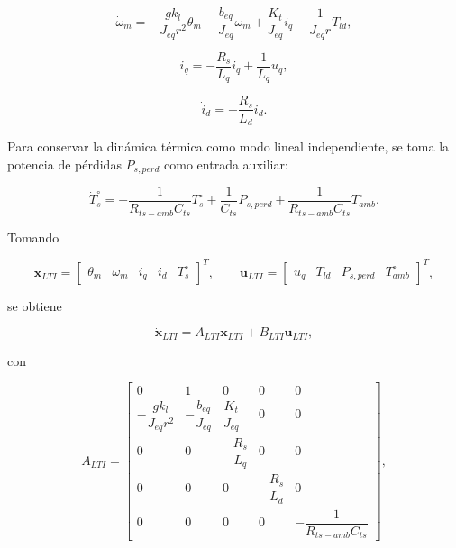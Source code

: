 \documentclass[10pt,a4paper]{article}
\begin{document}
\begin{equation}
    \dot{\omega}_m
    =
    -\frac{gk_l}{J_{eq}r^2}\theta_m
    -
    \frac{b_{eq}}{J_{eq}}\omega_m
    +
    \frac{K_t}{J_{eq}}i_q
    -
    \frac{1}{J_{eq}r}T_{ld},
    \label{eq:lti_omega_dot}
\end{equation}

\begin{equation}
    \dot{i}_q
    =
    -\frac{R_s}{L_q}i_q
    +
    \frac{1}{L_q}u_q,
    \label{eq:lti_iq_dot}
\end{equation}

\begin{equation}
    \dot{i}_d
    =
    -\frac{R_s}{L_d}i_d.
    \label{eq:lti_id_dot}
\end{equation}

Para conservar la dinámica térmica como modo lineal independiente, se toma la potencia de pérdidas \(P_{s,perd}\) como entrada auxiliar:

\begin{equation}
    \dot{T}_s^{\circ}
    =
    -\frac{1}{R_{ts-amb}C_{ts}}T_s^{\circ}
    +
    \frac{1}{C_{ts}}P_{s,perd}
    +
    \frac{1}{R_{ts-amb}C_{ts}}T_{amb}^{\circ}.
    \label{eq:lti_ts_dot}
\end{equation}

Tomando

\begin{equation}
    \mathbf{x}_{LTI}=\begin{bmatrix}\theta_m & \omega_m & i_q & i_d & T_s^{\circ}\end{bmatrix}^{T},
    \qquad
    \mathbf{u}_{LTI}=\begin{bmatrix}u_q & T_{ld} & P_{s,perd} & T_{amb}^{\circ}\end{bmatrix}^{T},
    \label{eq:x_u_lti}
\end{equation}

se obtiene

\begin{equation}
    \dot{\mathbf{x}}_{LTI}=A_{LTI}\mathbf{x}_{LTI}+B_{LTI}\mathbf{u}_{LTI},
    \label{eq:ss_lti}
\end{equation}

con

\begin{equation}
    A_{LTI}=
    \begin{bmatrix}
        0 & 1 & 0 & 0 & 0\\[1mm]
        -\dfrac{gk_l}{J_{eq}r^2} & -\dfrac{b_{eq}}{J_{eq}} & \dfrac{K_t}{J_{eq}} & 0 & 0\\[4mm]
        0 & 0 & -\dfrac{R_s}{L_q} & 0 & 0\\[4mm]
        0 & 0 & 0 & -\dfrac{R_s}{L_d} & 0\\[4mm]
        0 & 0 & 0 & 0 & -\dfrac{1}{R_{ts-amb}C_{ts}}
    \end{bmatrix},
    \label{eq:a_lti_simbolica}
\end{equation}
\end{document}
